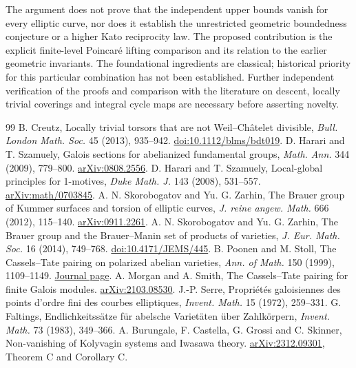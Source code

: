 \documentclass[11pt,a4paper]{article}
\theoremstyle{remark}\newtheorem{remark}[theorem]{Remark}
\begin{document}
The argument does not prove that the independent upper bounds vanish for every elliptic curve, nor does it establish the unrestricted geometric boundedness conjecture or a higher Kato reciprocity law. The proposed contribution is the explicit finite-level Poincar\'e lifting comparison and its relation to the earlier geometric invariants. The foundational ingredients are classical; historical priority for this particular combination has not been established. Further independent verification of the proofs and comparison with the literature on descent, locally trivial coverings and integral cycle maps are necessary before asserting novelty.
\begin{thebibliography}{99}\small
{} B. Creutz, Locally trivial torsors that are not Weil--Ch\^atelet divisible, \emph{Bull. London Math. Soc.} 45 (2013), 935--942. \href{https://doi.org/10.1112/blms/bdt019}{doi:10.1112/blms/bdt019}.
 D. Harari and T. Szamuely, Galois sections for abelianized fundamental groups, \emph{Math. Ann.} 344 (2009), 779--800. \href{https://arxiv.org/abs/0808.2556}{arXiv:0808.2556}.
 D. Harari and T. Szamuely, Local-global principles for 1-motives, \emph{Duke Math. J.} 143 (2008), 531--557. \href{https://arxiv.org/abs/math/0703845}{arXiv:math/0703845}.
 A. N. Skorobogatov and Yu. G. Zarhin, The Brauer group of Kummer surfaces and torsion of elliptic curves, \emph{J. reine angew. Math.} 666 (2012), 115--140. \href{https://arxiv.org/abs/0911.2261}{arXiv:0911.2261}.
 A. N. Skorobogatov and Yu. G. Zarhin, The Brauer group and the Brauer--Manin set of products of varieties, \emph{J. Eur. Math. Soc.} 16 (2014), 749--768. \href{https://doi.org/10.4171/JEMS/445}{doi:10.4171/JEMS/445}.
 B. Poonen and M. Stoll, The Cassels--Tate pairing on polarized abelian varieties, \emph{Ann. of Math.} 150 (1999), 1109--1149. \href{https://annals.math.princeton.edu/1999/150-3/p10}{Journal page}.
 A. Morgan and A. Smith, The Cassels--Tate pairing for finite Galois modules. \href{https://arxiv.org/abs/2103.08530}{arXiv:2103.08530}.
 J.-P. Serre, Propri\'et\'es galoisiennes des points d'ordre fini des courbes elliptiques, \emph{Invent. Math.} 15 (1972), 259--331.
 G. Faltings, Endlichkeitss\"atze f\"ur abelsche Variet\"aten \"uber Zahlk\"orpern, \emph{Invent. Math.} 73 (1983), 349--366.
 A. Burungale, F. Castella, G. Grossi and C. Skinner, Non-vanishing of Kolyvagin systems and Iwasawa theory. \href{https://arxiv.org/abs/2312.09301}{arXiv:2312.09301}, Theorem C and Corollary C.
\end{thebibliography}
\end{document}
